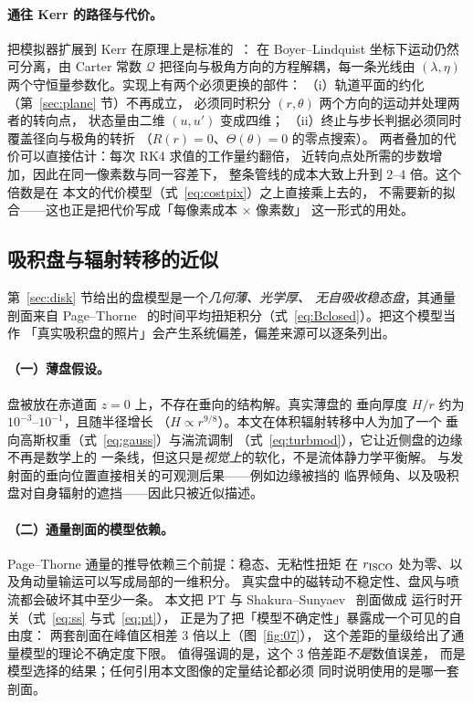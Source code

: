 \paragraph{通往 Kerr 的路径与代价。}
把模拟器扩展到 Kerr 在原理上是标准的~\cite{chandrasekhar1983,dexter2009}：
在 Boyer--Lindquist 坐标下运动仍然可分离，由 Carter 常数
$\mathcal{Q}$ 把径向与极角方向的方程解耦，每一条光线由
$(\lambda,\eta)$ 两个守恒量参数化。实现上有两个必须更换的部件：
（i）轨道平面的约化（第~\ref{sec:plane} 节）不再成立，
必须同时积分 $(r,\theta)$ 两个方向的运动并处理两者的转向点，
状态量由二维 $(u,u')$ 变成四维；
（ii）终止与步长判据必须同时覆盖径向与极角的转折
（$R(r)=0$、$\Theta(\theta)=0$ 的零点搜索）。
两者叠加的代价可以直接估计：每次 RK4 求值的工作量约翻倍，
近转向点处所需的步数增加，因此在同一像素数与同一容差下，
整条管线的成本大致上升到 $2$--$4$ 倍。这个倍数是在
本文的代价模型（式~\eqref{eq:costpix}）之上直接乘上去的，
不需要新的拟合——这也正是把代价写成「每像素成本 $\times$ 像素数」
这一形式的用处。

\subsection{吸积盘与辐射转移的近似}\label{sec:discuss-rt}

第~\ref{sec:disk} 节给出的盘模型是一个\emph{几何薄、光学厚、
无自吸收稳态盘}，其通量剖面来自 Page--Thorne~\cite{pt1974}
的时间平均扭矩积分（式~\eqref{eq:Bclosed}）。把这个模型当作
「真实吸积盘的照片」会产生系统偏差，偏差来源可以逐条列出。

\paragraph{（一）薄盘假设。}
盘被放在赤道面 $z=0$ 上，不存在垂向的结构解。真实薄盘的
垂向厚度 $H/r$ 约为 $10^{-3}$--$10^{-1}$，且随半径增长
（$H\propto r^{9/8}$）。本文在体积辐射转移中人为加了一个
垂向高斯权重（式~\eqref{eq:gauss}）与湍流调制
（式~\eqref{eq:turbmod}），它让近侧盘的边缘不再是数学上的
一条线，但这只是\emph{视觉上}的软化，不是流体静力学平衡解。
与发射面的垂向位置直接相关的可观测后果——例如边缘被挡的
临界倾角、以及吸积盘对自身辐射的遮挡——因此只被近似描述。

\paragraph{（二）通量剖面的模型依赖。}
Page--Thorne 通量的推导依赖三个前提：稳态、无粘性扭矩
在 $r_{\mathrm{ISCO}}$ 处为零、以及角动量输运可以写成局部的一维积分。
真实盘中的磁转动不稳定性、盘风与喷流都会破坏其中至少一条。
本文把 PT 与 Shakura--Sunyaev~\cite{ss1973} 剖面做成
运行时开关（式~\eqref{eq:ss} 与式~\eqref{eq:pt}），
正是为了把「模型不确定性」暴露成一个可见的自由度：
两套剖面在峰值区相差 $3$ 倍以上（图~\ref{fig:07}），
这个差距的量级给出了通量模型的理论不确定度下限。
值得强调的是，这个 $3$ 倍差距\emph{不是}数值误差，
而是模型选择的结果；任何引用本文图像的定量结论都必须
同时说明使用的是哪一套剖面。

